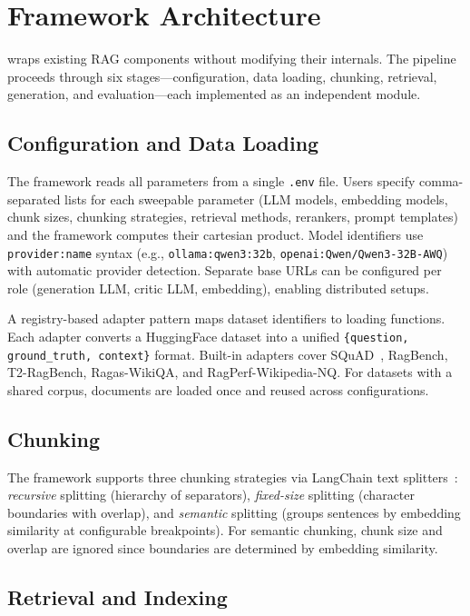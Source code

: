 \section{Framework Architecture}
\label{sec:methodology}

\toolname{} wraps existing RAG components without modifying their internals. The pipeline proceeds through six stages---configuration, data loading, chunking, retrieval, generation, and evaluation---each implemented as an independent module.

\subsection{Configuration and Data Loading}

The framework reads all parameters from a single \texttt{.env} file. Users specify comma-separated lists for each sweepable parameter (LLM models, embedding models, chunk sizes, chunking strategies, retrieval methods, rerankers, prompt templates) and the framework computes their cartesian product. Model identifiers use \texttt{provider:name} syntax (e.g., \texttt{ollama:qwen3:32b}, \texttt{openai:Qwen/Qwen3-32B-AWQ}) with automatic provider detection. Separate base URLs can be configured per role (generation LLM, critic LLM, embedding), enabling distributed setups.

A registry-based adapter pattern maps dataset identifiers to loading functions. Each adapter converts a HuggingFace dataset into a unified \texttt{\{question, ground\_truth, context\}} format. Built-in adapters cover SQuAD~\cite{rajpurkar2016squad}, RagBench, T2-RagBench, Ragas-WikiQA, and RagPerf-Wikipedia-NQ. For datasets with a shared corpus, documents are loaded once and reused across configurations.

\subsection{Chunking}

The framework supports three chunking strategies via LangChain text splitters~\cite{wolf2020transformers}: \emph{recursive} splitting (hierarchy of separators), \emph{fixed-size} splitting (character boundaries with overlap), and \emph{semantic} splitting (groups sentences by embedding similarity at configurable breakpoints). For semantic chunking, chunk size and overlap are ignored since boundaries are determined by embedding similarity.

\subsection{Retrieval and Indexing}

